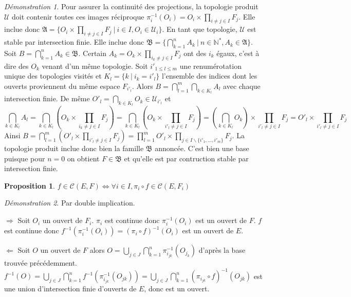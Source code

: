 \documentclass[a4paper, 11pt, french]{book}
\newenvironment{itemise}{\itemize}{\enditemize}
\theoremstyle{plain} %
\newtheorem{proposition}{Proposition}
\theoremstyle{definition} %
\theoremstyle{remark} %
\newtheorem*{demonstration}{Démonstration}
\renewcommand{\setminus}{\backslash}
\newcommand{\1}{\mathds{1}}
\newcommand{\cont}{\mathcal{C}}
\newcommand{\infegal}{\leqslant}
\newcommand{\inv}[1]{#1^{-1}}
\newcommand{\N}{\mathbb{N}}
\newcommand\ens[2]{\{#1 \ |\ #2\}}
\begin{document}
\begin{demonstration}
	Pour assurer la continuité des projections, la topologie produit $\mathscr{U}$ doit contenir toutes ces images réciproque $\inv{\pi_i}(O_i)=O_i\times\prod_{i\neq j\in I}F_j$.
	Elle inclue donc $\mathfrak{A}=\ens{O_i\times\prod_{i\neq j\in I}F_j}{i\in I, O_i\in\mathscr{U}_i}$.
	En tant que topologie, $\mathscr{U}$ est stable par intersection finie.
	Elle inclue donc $\mathfrak{B}=\ens{\bigcap_{k=1}^nA_k}{n\in\N^*, A_k\in\mathfrak{A}}$.
	Soit $B=\bigcap_{k=1}^nA_k\in\mathfrak{B}$.
	Certain $A_k=O_k\times\prod_{i_k\neq j\in I}F_j$ ont des $i_k$ égaux, c'est à dire des $O_k$ venant d'un même topologie.
	Soit $i'_{1\infegal l\infegal m}$ une renumérotation unique des topologies visités et $K_l=\ens{k}{i_k=i'_l}$ l'ensemble des indices dont les ouverts proviennent du même espace $F_{i'_l}$.
	Alors $B=\bigcap_{l=1}^m\bigcap_{k\in K_l}A_l$ avec chaque intersection finie.
	De même $O'_l=\bigcap_{k\in K_l}O_k\in\mathscr{U}_{i'_l}$ et
	$$
		\bigcap_{k\in K_l}A_l
		=\bigcap_{k\in K_l}(O_k\times\prod_{i_k\neq j\in I}F_j)
		=\bigcap_{k\in K_l}(O_k\times\prod_{i'_l\neq j\in I}F_j)
		=(\bigcap_{k\in K_l}O_k)\times\prod_{i'_l\neq j\in I}F_j
		=O'_l\times\prod_{i'_l\neq j\in I}F_j
	$$
	Ainsi $B=\bigcap_{l=1}^m(O'_l\times\prod_{i'_l\neq j\in I}F_j)=\prod_{l=1}^mO'_l\times\prod_{j\in I\setminus\{i'_1,...,i'_m\}}F_j$.
	La topologie produit inclue donc bien la famille $\mathfrak{B}$ annoncée.
	C'est bien une base puisque pour $n=0$ on obtient $F\in\mathfrak{B}$ et qu'elle est par contruction stable par intersection finie.
\end{demonstration}

\begin{proposition}
	$f\in\cont(E, F)\iff\forall i\in I, \pi_i\circ f\in\cont(E, F_i)$
\end{proposition}

\begin{demonstration}
	Par double implication.
	\begin{itemise}
		\item[$\Rightarrow$] Soit $O_i$ un ouvert de $F_i$.
		$\pi_i$ est continue donc $\inv{\pi_i}(O_i)$ est un ouvert de $F$.
		$f$ est continue donc $\inv{f}(\inv{\pi_i}(O_i))=\inv{(\pi_i\circ f)}(O_i)$ est un ouvert de $E$.
		\item[$\Leftarrow$] Soit $O$ un ouvert de $F$ alors $O=\bigcup_{j\in J}\bigcap_{k=1}^n\inv{\pi_{i_{jk}}}(O_{j_k})$ d'après la base trouvée précédemment.
		$\inv{f}(O)=\bigcup_{j\in J}\bigcap_{k=1}^n\inv{f}(\inv{\pi_{i_{jk}}}(O_{jk}))=\bigcup_{j\in J}\bigcap_{k=1}^n\inv{(\pi_{i_{jk}}\circ f)}(O_{jk})$ est une union d'intersection finie d'ouverts de $E$, donc est un ouvert.
	\end{itemise}
\end{demonstration}
\end{document}
